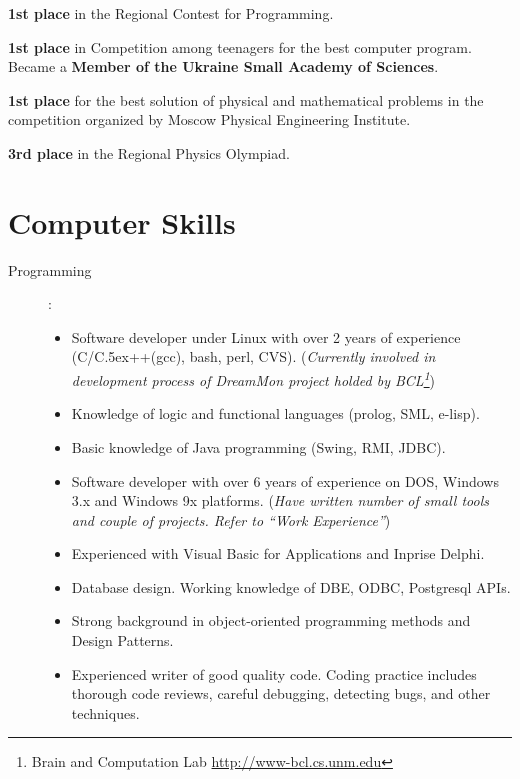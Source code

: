 \documentclass[10pt,overlapped,line]{res}
\def\Cplusplus{{\rm C\raise.5ex\hbox{\small ++}}}
\newcommand{\mplace}[1]{\textbf{#1}}
\newcommand{\wdescription}[1]{({\small \textit{#1}})}
\begin{document}
\begin{resume}
\begin{position}
\mplace{1st place} in the Regional Contest for Programming.
\end{position}

\begin{position}
  \mplace{1st place} in Competition among teenagers for the best
  computer program. Became a \mplace{Member of the Ukraine Small Academy
    of Sciences}.
\end{position}

\begin{position}
  \mplace{1st place} for the best solution of physical and mathematical
  problems in the competition organized by Moscow Physical Engineering Institute.
\end{position}

\begin{position}
  \mplace{3rd place} in the Regional Physics Olympiad.

\end{position}

\section{Computer Skills}
 \begin{description}
   \item[Programming]:\\
     \begin{itemize}

     \item Software developer under Linux with over 2 years of
       experience (C/\Cplusplus(gcc), bash, perl, CVS). 
       \wdescription{Currently involved in development process of
       DreamMon project holded by BCL\footnote{ Brain and Computation
       Lab \href{URL}{http://www-bcl.cs.unm.edu}}}

     \item Knowledge of logic and functional languages (prolog, SML, e-lisp).
     \item Basic knowledge of Java programming (Swing, RMI, JDBC).
     \item Software developer with over 6 years of experience on DOS,
       Windows 3.x and Windows 9x platforms.
       \wdescription{Have written number of small tools and couple of
       projects. Refer to ``Work Experience''}
     \item Experienced with Visual Basic for Applications and Inprise
       Delphi.
     \item Database design. Working knowledge of DBE, ODBC, Postgresql
       APIs. 
     \item Strong background in object-oriented programming methods
       and Design Patterns.
     \item Experienced writer of good quality code. Coding practice
       includes thorough code reviews, careful debugging, detecting
       bugs, and other techniques.
     \end{itemize} 


\end{description}
\end{resume}
\end{document}
